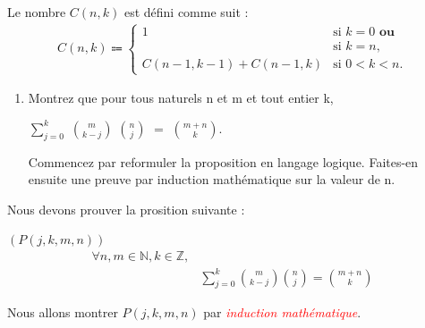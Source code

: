 \documentclass[16pt]{report}
\begin{document}
\begin{multicols*}{2}
\begin{Definition}{}{}
    Le nombre \( C(n, k) \) est défini comme suit :
    \begin{align*}
            C(n, k) \Coloneqq
            \begin{cases}
                1 & \text{si } k = 0 \textbf{ ou } \\ 
                  & \text{si } k = n, \\
                C(n-1, k-1) + C(n-1, k) & \text{si } 0 < k < n.
            \end{cases}             
    \end{align*}    
\end{Definition}

    \begin{enumerate}
        \item Montrez que pour tous naturels n et m et tout entier k, 
            \begin{center}
            $ \sum_{j=0}^{k}$ $m \choose k-j$ $n \choose j$ $=$ $m+n \choose k$.  
            \end{center}
        Commencez par reformuler la proposition en langage logique. Faites-en ensuite
        une preuve par induction mathématique sur la valeur de n.
    \end{enumerate}

    Nous devons prouver la prosition suivante : 

    \begin{prop}{$\left(P(j, k , m,  n)\right)$}{}
    \begin{align*}
        \forall n, m \in \mathbb{N}, k \in \mathbb{Z},&
             \\ 
                         &\sum_{j=0}^{k} {m \choose k-j} {n \choose j} = {m+n \choose k}
    \end{align*}       
    \end{prop}

    \begin{Preuve*}{}{}
        Nous allons montrer $P(j, k, m, n)$ par \textit{\textcolor{red}{induction mathématique}}.   


\end{Preuve*}
\end{multicols*}
\end{document}
